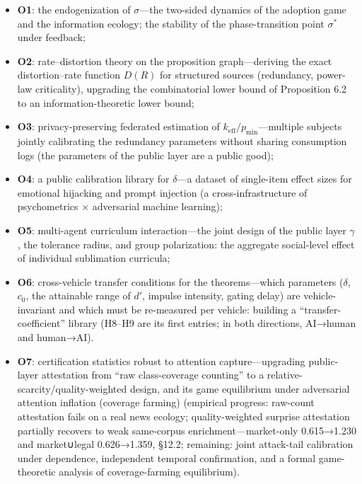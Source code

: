 \documentclass[
  11pt]{article}
\providecommand{\tightlist}{%
  \setlength{\itemsep}{0pt}\setlength{\parskip}{0pt}}
\begin{document}
\begin{itemize}
\tightlist
\item
  \textbf{O1}: the endogenization of \(\sigma\)---the two-sided dynamics
  of the adoption game and the information ecology; the stability of the
  phase-transition point \(\sigma^*\) under feedback;
\item
  \textbf{O2}: rate--distortion theory on the proposition
  graph---deriving the exact distortion--rate function \(D(R)\) for
  structured sources (redundancy, power-law criticality), upgrading the
  combinatorial lower bound of Proposition 6.2 to an
  information-theoretic lower bound;
\item
  \textbf{O3}: privacy-preserving federated estimation of
  \(k_{\mathrm{eff}}/p_{\min}\)---multiple subjects jointly calibrating
  the redundancy parameters without sharing consumption logs (the
  parameters of the public layer are a public good);
\item
  \textbf{O4}: a public calibration library for \(\delta\)---a dataset
  of single-item effect sizes for emotional hijacking and prompt
  injection (a cross-infrastructure of psychometrics × adversarial
  machine learning);
\item
  \textbf{O5}: multi-agent curriculum interaction---the joint design of
  the public layer \(\gamma\), the tolerance radius, and group
  polarization: the aggregate social-level effect of individual
  sublimation curricula;
\item
  \textbf{O6}: cross-vehicle transfer conditions for the
  theorems---which parameters (\(\delta\), \(c_0\), the attainable range
  of \(d'\), impulse intensity, gating delay) are vehicle-invariant and
  which must be re-measured per vehicle: building a
  ``transfer-coefficient'' library (H8--H9 are its first entries; in
  both directions, AI→human and human→AI).
\item
  \textbf{O7}: certification statistics robust to attention
  capture---upgrading public-layer attestation from ``raw class-coverage
  counting'' to a relative-scarcity/quality-weighted design, and its
  game equilibrium under adversarial attention inflation (coverage
  farming) (empirical progress: raw-count attestation fails on a real
  news ecology; quality-weighted surprise attestation partially recovers
  to weak same-corpus enrichment---market-only 0.615→1.230 and
  market∪legal 0.626→1.359, §12.2; remaining: joint attack-tail
  calibration under dependence, independent temporal confirmation, and a
  formal game-theoretic analysis of coverage-farming equilibrium).

\end{itemize}
\end{document}
